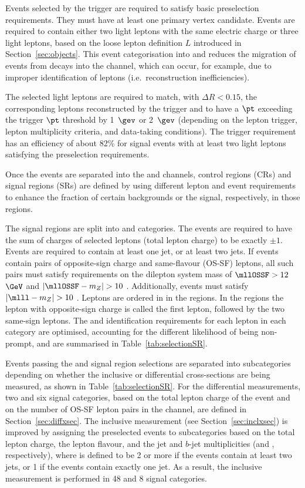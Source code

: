 \documentclass[cernpreprint, atlasdraft=false, texlive=2023, UKenglish, texmf, orcidlogo]{atlasdoc}
\begin{document}
Events selected by the trigger are required to satisfy basic preselection requirements. They must have at least one primary vertex candidate.
Events are required to contain either two light leptons with the same electric charge or three light leptons, based on the loose lepton definition $L$ introduced in Section~\ref{sec:objects}. This event categorisation into \llSS and \lll reduces the migration of events from \lll \ttW decays into the \ll channel, which can occur, for example, due to improper identification of leptons (i.e.\ reconstruction inefficiencies).
 
The selected light leptons are required to match, with $\Delta R < 0.15$, the corresponding leptons reconstructed by the trigger and to have a $\pt$ exceeding the trigger $\pt$ threshold by 1~$\gev$ or 2~$\gev$ (depending on the lepton trigger, lepton multiplicity criteria, and data-taking conditions).
The trigger requirement has an efficiency of about 82\% for signal events with at least two light leptons satisfying the preselection requirements.
 
Once the events are separated into the \llSS and \lll channels, control regions (CRs) and signal regions (SRs) are defined by using different lepton and event requirements to enhance the fraction of certain backgrounds or the \ttW signal, respectively, in those regions.
 
The signal regions are split into \llSS and \lll categories. The \lll events are required to have the sum of charges of selected leptons (total lepton charge) to be exactly $\pm 1$. Events are required to contain at least one \btight jet, or at least two \bloose jets. If \lll events contain pairs of opposite-sign charge and same-flavour (OS-SF) leptons, all such pairs must satisfy requirements on the dilepton system mass of $\mllOSSF > 12$ $\GeV$ and $|\mllOSSF - m_Z| > 10$ \GeV. Additionally, \lll events must satisfy $|\mlll - m_Z| > 10$ \GeV.
Leptons are ordered in \pt in the \llSS regions. In the \lll regions the lepton with opposite-sign charge is called the first lepton, followed by the two same-sign leptons.
The \pt and identification requirements for each lepton in each category are optimised, accounting for the different likelihood of being non-prompt, and are summarised in Table~\ref{tab:selectionSR}.
 
Events passing the \llSS and \lll signal region selections are separated into subcategories depending on whether the inclusive or differential \ttW cross-sections are being measured, as shown in Table~\ref{tab:selectionSR}.
For the \ttW differential measurements, two \llSS and six \lll signal categories, based on the total lepton charge of the event and on the number of OS-SF lepton pairs in the \lll channel, are defined in Section~\ref{sec:diffxsec}. The inclusive \ttW measurement (see Section~\ref{sec:inclxsec}) is improved by assigning the preselected events to subcategories based on the total lepton charge, the lepton flavour, and the jet and $b$-jet multiplicities (\njets and \nbjets, respectively), where \nbjets is defined to be 2 or more if the events contain at least two \bloose jets, or 1 if the events contain exactly one \btight jet. As a result, the \ttW inclusive measurement is performed in 48 \llSS and 8 \lll signal categories.
 
\end{document}
